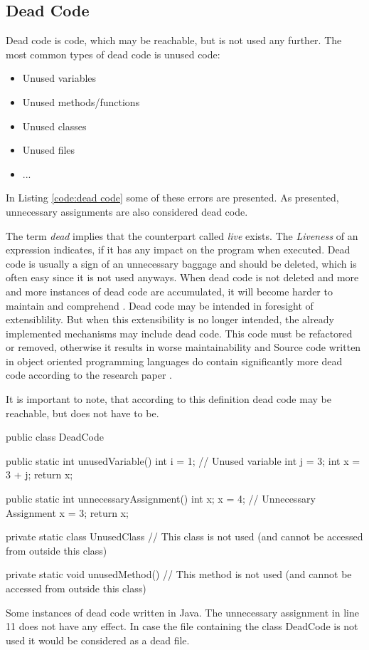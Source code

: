 \subsection{Dead Code}
\label{sub:dead code}

Dead code is code, which may be reachable, but is not used any further.
The most common types of dead code is unused code:
\begin{itemize}
	\item Unused variables \cite{Prahofer_2012}
	\item Unused methods/functions \cite{Romano_2016}
	\item Unused classes
	\item Unused files \cite{Boomsma_2012}
	\item ...
\end{itemize}
In Listing \ref{code:dead code} some of these errors are presented. As presented, unnecessary assignments are also considered dead code.


The term \emph{dead} implies that the counterpart called \emph{live} exists. 
The \emph{Liveness} of an expression indicates, if it has any impact on the program when executed.
Dead code is usually a sign of an unnecessary baggage and should be deleted, which is often easy since it is not used anyways.
When dead code is not deleted and more and more instances of dead code are accumulated, it will become harder to maintain and comprehend \cite{Romano_2020}. Dead code may be intended in foresight of extensiblility. But when this extensibility is no longer intended, the already implemented mechanisms may include dead code. This code must be refactored or removed, otherwise it results in worse maintainability and 
Source code written in object oriented programming languages do contain significantly more dead code according to the research paper \cite{Srivastava_1992}.


It is important to note, that according to this definition dead code may be reachable, but does not have to be.



\begin{program}
	\begin{JavaCode}
public class DeadCode {
	public static int unusedVariable() {
		int i = 1; // Unused variable
		int j = 3;
		int x = 3 + j;
		return x;
	}
			
	public static int unnecessaryAssignment() {
		int x;
		x = 4; // Unnecessary Assignment
		x = 3;
		return x;
	}
			
	private static class UnusedClass {
		// This class is not used (and cannot be accessed from outside this class)
	}
			
	private static void unusedMethod() {
		// This method is not used (and cannot be accessed from outside this class)
	}
}\end{JavaCode}
	\caption{Some instances of dead code written in Java. The unnecessary assignment in line 11 does not have any effect. In case the file containing the class DeadCode is not used it would be considered as a dead file.}
	\label{code:dead code}
\end{program}

